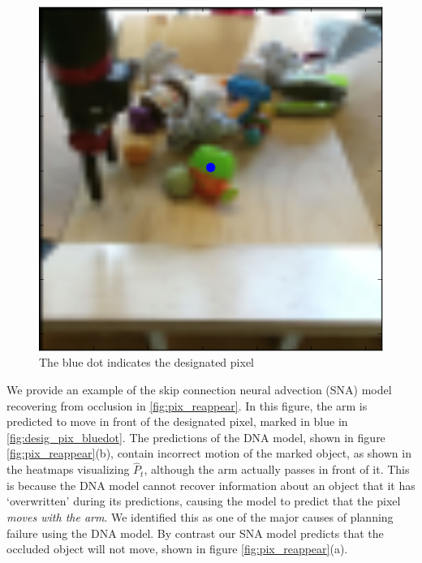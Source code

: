 \begin{figure}
	\centering
	\includegraphics[width=0.37\columnwidth]{images_sna/occlusionaware/img_desigpixb0.png}
	\caption{The blue dot indicates the designated pixel}
	\label{fig:desig_pix_bluedot}
\end{figure}

We provide an example of the skip connection neural advection (SNA) model recovering from occlusion in \autoref{fig:pix_reappear}. In this figure, the arm is predicted to move in front of the designated pixel, marked in blue in \autoref{fig:desig_pix_bluedot}. The predictions of the DNA model, shown in figure \autoref{fig:pix_reappear}(b), contain incorrect motion of the marked object, as shown in the heatmaps visualizing $\hat{P}_t$, although the arm actually passes in front of it. This is because the DNA model cannot recover information about an object that it has `overwritten' during its predictions, causing the model to predict that the pixel \emph{moves with the arm}. We identified this as one of the major causes of planning failure using the DNA model. By contrast our SNA model predicts that the occluded object will not move, shown in figure  \autoref{fig:pix_reappear}(a).

